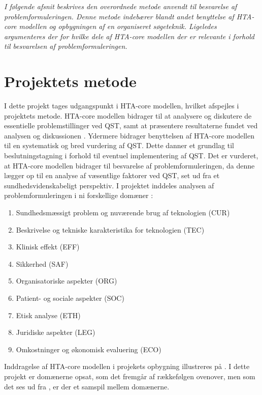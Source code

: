 \textit{I følgende afsnit beskrives den overordnede metode anvendt til besvarelse af problemformuleringen. Denne metode indebærer blandt andet benyttelse af HTA-core modellen og opbygningen af en organiseret søgeteknik. Ligeledes argumenteres der for hvilke dele af HTA-core modellen der er relevante i forhold til besvarelsen af problemformuleringen.}

\section{Projektets metode}
I dette projekt tages udgangspunkt i HTA-core modellen, hvilket afspejles i projektets metode. HTA-core modellen bidrager til at analysere og diskutere de essentielle problemstillinger ved QST, samt at præsentere resultaterne fundet ved analysen og diskussionen \citep{HTAcore}. Ydermere bidrager benyttelsen af HTA-core modellen til en systematisk og bred vurdering af QST. Dette danner et grundlag til beslutningstagning i forhold til eventuel implementering af QST. \citep{metodehaandbogen} \citep{HTAcore} Det er vurderet, at HTA-core modellen bidrager til besvarelse af problemformuleringen, da denne lægger op til en analyse af væsentlige faktorer ved QST, set ud fra et sundhedsvidenskabeligt perspektiv. I projektet inddeles analysen af problemformuleringen i ni forskellige domæner \citep{HTAcore}:

\begin{enumerate}
\item Sundhedsmæssigt problem og nuværende brug af teknologien (CUR)
\item Beskrivelse og tekniske karakteristika for teknologien (TEC)
\item Klinisk effekt (EFF)
\item Sikkerhed (SAF)
\item Organisatoriske aspekter (ORG)
\item Patient- og sociale aspekter (SOC)
\item Etisk analyse (ETH)
\item Juridiske aspekter (LEG)
\item Omkostninger og økonomisk evaluering (ECO)
\end{enumerate}

Inddragelse af HTA-core modellen i projekets opbygning illustreres på . I dette projekt er domænerne opsat, som det fremgår af rækkefølgen ovenover, men som det ses ud fra , er der et samspil mellem domænerne. 

